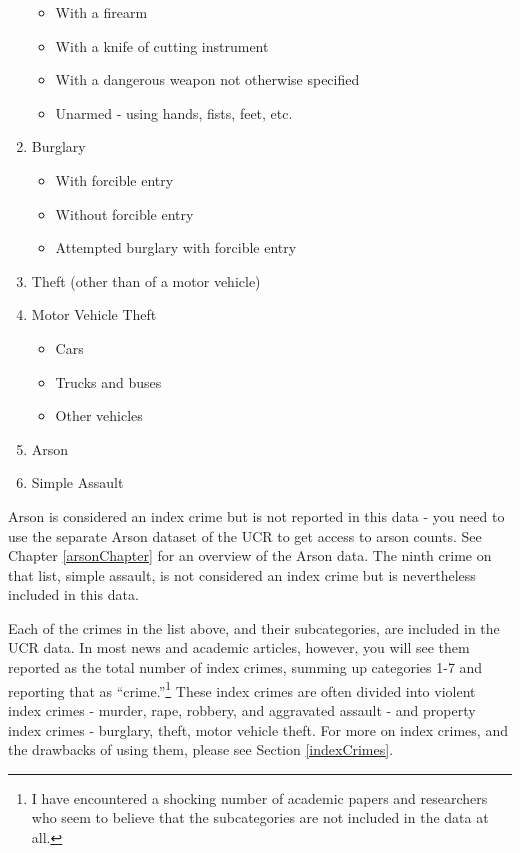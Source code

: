 \documentclass[
]{krantz}
\providecommand{\tightlist}{%
  \setlength{\itemsep}{0pt}\setlength{\parskip}{0pt}}
\begin{document}
\begin{enumerate}
  \begin{itemize}
  \tightlist
  \item
    With a firearm\\
  \item
    With a knife of cutting instrument\\
  \item
    With a dangerous weapon not otherwise specified\\
  \item
    Unarmed - using hands, fists, feet, etc.\\
  \end{itemize}
\item
  Burglary

  \begin{itemize}
  \tightlist
  \item
    With forcible entry\\
  \item
    Without forcible entry\\
  \item
    Attempted burglary with forcible entry\\
  \end{itemize}
\item
  Theft (other than of a motor vehicle)\\
\item
  Motor Vehicle Theft

  \begin{itemize}
  \tightlist
  \item
    Cars\\
  \item
    Trucks and buses\\
  \item
    Other vehicles\\
  \end{itemize}
\item
  Arson\\
\item
  Simple Assault
\end{enumerate}

Arson is considered an index crime but is not reported in
this data - you need to use the separate Arson dataset of
the UCR to get access to arson counts. See Chapter
\ref{arsonChapter} for an overview of the Arson data. The
ninth crime on that list, simple assault, is not considered
an index crime but is nevertheless included in this data.

Each of the crimes in the list above, and their
subcategories, are included in the UCR data. In most news
and academic articles, however, you will see them reported
as the total number of index crimes, summing up categories
1-7 and reporting that as ``crime.''\footnote{I have
  encountered a shocking number of academic papers and
  researchers who seem to believe that the subcategories are
  not included in the data at all.} These index crimes are
often divided into violent index crimes - murder, rape,
robbery, and aggravated assault - and property index crimes
- burglary, theft, motor vehicle theft. For more on index
crimes, and the drawbacks of using them, please see Section
\ref{indexCrimes}.
\end{document}
